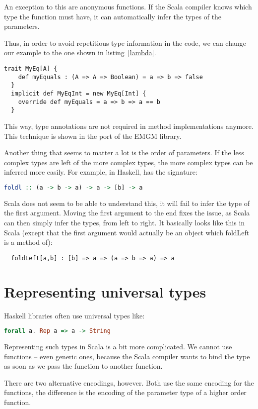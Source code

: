 An exception to this are anonymous functions.
If the Scala compiler knows which type the
function must have, it can automatically infer the types of the parameters.

Thus, in order to avoid repetitious type information in the code,
we can change our  example to the one shown in listing~\ref{lambda}.
\begin{lstlisting}[caption=Improving type inference using lambdas,label=lambda]
  trait MyEq[A] {
    def myEquals : (A => A => Boolean) = a => b => false
  }
  implicit def MyEqInt = new MyEq[Int] {
    override def myEquals = a => b => a == b
  }
\end{lstlisting}
This way,
type annotations are not required in method implementations anymore. This
technique is shown in the port of the EMGM library.

Another thing that seems to matter a lot is the order of parameters. If
the less complex types are left of the more complex types, the more
complex types can be inferred more easily. For example, in Haskell,
 has the signature:
\begin{lstlisting}[language=Haskell]
  foldl :: (a -> b -> a) -> a -> [b] -> a
\end{lstlisting}
Scala does not seem to be able to understand this, it will fail to
infer the type of the first argument. Moving the first argument to
the end fixes the issue, as Scala can then simply infer the types, from left
to right. It basically looks like this in Scala (except that
the first argument would actually be an object which foldLeft is a method
of):
\begin{lstlisting}
  foldLeft[a,b] : [b] => a => (a => b => a) => a
\end{lstlisting}

\section{Representing universal types}
\label{universal-types}
Haskell libraries often use universal types like:
\begin{lstlisting}[language=Haskell]
  forall a. Rep a => a -> String
\end{lstlisting}
Representing such types in Scala is a bit more complicated. We cannot use
functions -- even generic ones, because the Scala
compiler wants to bind the  type as soon as we pass the function to
another function.

There are two alternative encodings, however. Both use the same encoding for
the functions, the difference is the encoding of the parameter type of a higher
order function.

